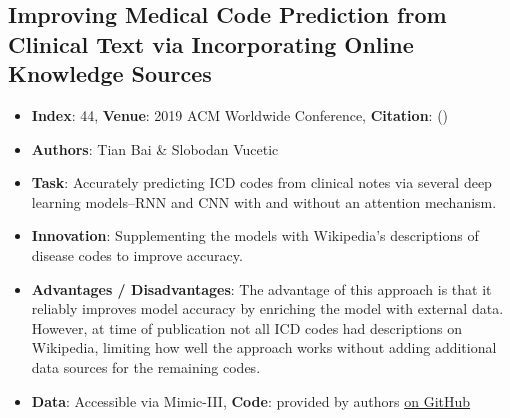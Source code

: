 \documentclass[
	letterpaper, %
]{jdf}
\newcommand{\pcite}[1]{(\cite{#1})}
\begin{document}
\subsection{Improving Medical Code Prediction from Clinical Text via Incorporating Online Knowledge Sources}
\begin{itemize}[noitemsep,topsep=0pt,parsep=0pt,partopsep=0pt]
\item \textbf{Index}: 44, \textbf{Venue}: 2019 ACM Worldwide Conference, \textbf{Citation}: \pcite{improving_code_prediction}
\item \textbf{Authors}: Tian Bai & Slobodan Vucetic
\item \textbf{Task}: Accurately predicting ICD codes from clinical notes via several deep learning models–RNN and CNN with and without an attention mechanism.
\item \textbf{Innovation}: Supplementing the models with Wikipedia's descriptions of disease codes to improve accuracy.
\item \textbf{Advantages / Disadvantages}: The advantage of this approach is that it reliably improves model accuracy by enriching the model with external data. However, at time of publication not all ICD codes had descriptions on Wikipedia, limiting how well the approach works without adding additional data sources for the remaining codes.
\item \textbf{Data}: Accessible via Mimic-III, \textbf{Code}: provided by authors \href{https://github.com/tiantiantu/KSI}{on GitHub}
\end{itemize}
\end{document}
